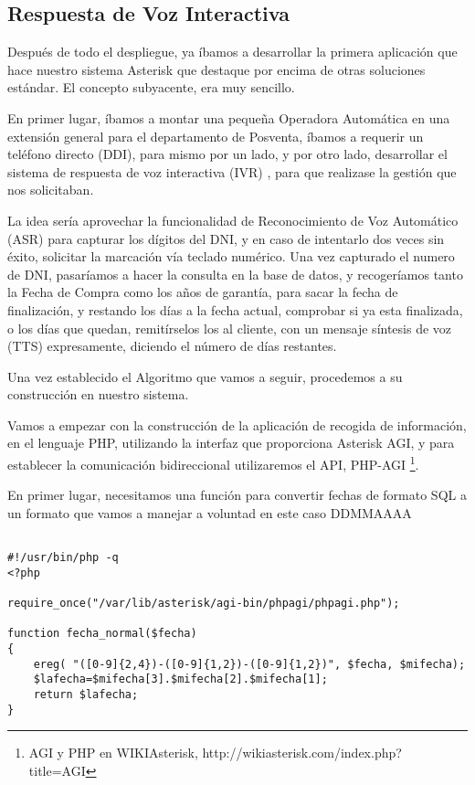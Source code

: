 \color[rgb]{0,0,0}

\newpage

\subsection{Respuesta de Voz Interactiva}

Después de todo el despliegue, ya íbamos a desarrollar la primera aplicación que hace nuestro sistema Asterisk que destaque por encima de otras soluciones estándar. El concepto subyacente, era muy sencillo.

En primer lugar, íbamos a montar una pequeña Operadora Automática en una extensión general para el departamento de Posventa, íbamos a requerir un teléfono directo (DDI), para mismo por un lado, y por otro lado, desarrollar el sistema de respuesta de voz interactiva (IVR) \cite{website:ivr}, para que realizase la gestión que nos solicitaban.

La idea sería aprovechar la funcionalidad de Reconocimiento de Voz Automático (ASR) para capturar los dígitos del DNI, y en caso de intentarlo dos veces sin éxito, solicitar la marcación vía teclado numérico. Una vez capturado el numero de DNI, pasaríamos a hacer la consulta en la base de datos, y recogeríamos tanto la Fecha de Compra como los años de garantía, para sacar la fecha de finalización, y restando los días a la fecha actual, comprobar si ya esta finalizada, o los días que quedan, remitírselos los al cliente, con un mensaje síntesis de voz (TTS) expresamente, diciendo el número de días restantes.

Una vez establecido el Algoritmo que vamos a seguir, procedemos a su construcción en nuestro sistema.

Vamos a empezar con la construcción de la aplicación de recogida de información, en el lenguaje PHP, utilizando la interfaz que proporciona Asterisk AGI, y para establecer la comunicación bidireccional utilizaremos el API, PHP-AGI \footnote{AGI y PHP en WIKIAsterisk, http://wikiasterisk.com/index.php?title=AGI}.

En primer lugar, necesitamos una función para convertir fechas de formato SQL a un formato que vamos a manejar a voluntad en este caso DDMMAAAA

\begin{lstlisting}[style=php,title={/var/lib/asterisk/agi-bin/fingarantia.php}]

#!/usr/bin/php -q
<?php

require_once("/var/lib/asterisk/agi-bin/phpagi/phpagi.php");

function fecha_normal($fecha)
{
    ereg( "([0-9]{2,4})-([0-9]{1,2})-([0-9]{1,2})", $fecha, $mifecha);
    $lafecha=$mifecha[3].$mifecha[2].$mifecha[1];
    return $lafecha;
}

\end{lstlisting}

